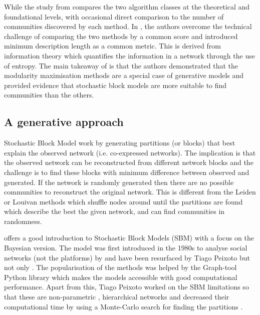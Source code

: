While the study from \citet{Peixoto2021-jx} compares the two algorithm classes at the theoretical and foundational levels, with occasional direct comparison to the number of communities discovered by each method. In \citet{Peixoto2023-rt}, the authors overcome the technical challenge of comparing the two methods by a common score and introduced minimum description length as a common metric. This is derived from information theory which quantifies the information in a network through the use of entropy. The main takeaway of \citet{Peixoto2023-rt} is that the authors demonstrated that the modularity maximisation methods are a special case of generative models and provided evidence that stochastic block models are more suitable to find communities than the others.

\subsection{A generative approach} \label{s:lit:sbm}


Stochastic Block Model work by generating partitions (or blocks) that best explain the observed network (i.e. co-expressed networks). The implication is that the observed network can be reconstructed from different network blocks and the challenge is to find these blocks with minimum difference between observed and generated. If the network is randomly generated then there are no possible communities to reconstruct the original network. This is different from the Leiden or Louivan methods which shuffle nodes around until the partitions are found which describe the best the given network, and can find communities in randomness. 

\citet{Peixoto2019-fg} offers a good introduction to Stochastic Block Models (SBM) with a focus on the Bayesian version. The model was first introduced in the 1980s to analyse social networks (not the platforms) by \citet{Holland1983-eu} and have been resurfaced by Tiago Peixoto \citep{Peixoto2014-ls, Peixoto2017-gc, Peixoto2018-ot} but not only \citep{Karrer2011-si}. The popularisation of the methods was helped by the Graph-tool Python library \citep{Peixoto2014-ls} which makes the models accessible with good computational performance. Apart from this, Tiago Peixoto worked on the SBM limitations so that these are non-parametric \citep{Peixoto2017-gc, Peixoto2018-ot}, hierarchical networks \citep{Peixoto2014-yb} and decreased their computational time by using a Monte-Carlo search for finding the partitions \citep{Peixoto2014-ss}.

